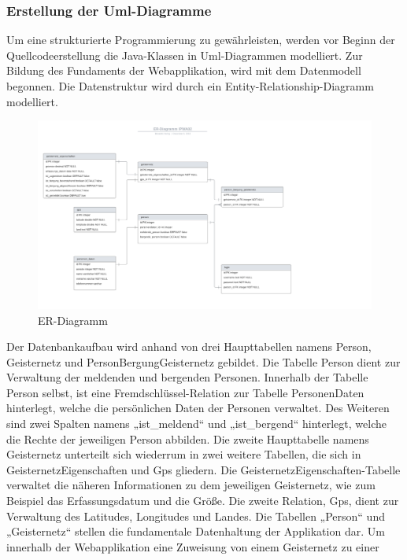 \documentclass[11pt]{article}
\begin{document}
    \subsubsection{Erstellung der Uml-Diagramme}
    Um eine strukturierte Programmierung zu gewährleisten, werden vor Beginn der Quellcodeerstellung die Java-Klassen in Uml-Diagrammen modelliert.
    Zur Bildung des Fundaments der Webapplikation, wird mit dem Datenmodell begonnen. Die Datenstruktur wird durch ein Entity-Relationship-Diagramm modelliert.
    \begin{figure}[H]
        \centering
        \includegraphics[width=\textwidth]{abbildungen/ER-Diagramm.png}
        \caption{ER-Diagramm}
        \label{er-diagramm}
    \end{figure} 
    Der Datenbankaufbau wird anhand von drei Haupttabellen namens Person, Geisternetz und PersonBergungGeisternetz gebildet.
    Die Tabelle Person dient zur Verwaltung der meldenden und bergenden Personen. Innerhalb der Tabelle Person selbst, ist 
    eine Fremdschlüssel-Relation zur Tabelle PersonenDaten hinterlegt, welche die persönlichen Daten der Personen
    verwaltet. Des Weiteren sind zwei Spalten namens „ist\_meldend“ und „ist\_bergend“ hinterlegt, welche die Rechte der jeweiligen Person abbilden.
    Die zweite Haupttabelle namens Geisternetz unterteilt sich wiederrum in zwei weitere Tabellen, die sich in GeisternetzEigenschaften und Gps gliedern.
    Die GeisternetzEigenschaften-Tabelle verwaltet die näheren Informationen zu dem jeweiligen Geisternetz, wie zum Beispiel das Erfassungsdatum und die Größe. Die zweite Relation, Gps, dient zur Verwaltung
    des Latitudes, Longitudes und Landes.
    Die Tabellen „Person“ und „Geisternetz“ stellen die fundamentale Datenhaltung der Applikation dar. Um innerhalb der Webapplikation eine Zuweisung von einem Geisternetz zu einer 
\end{document}
